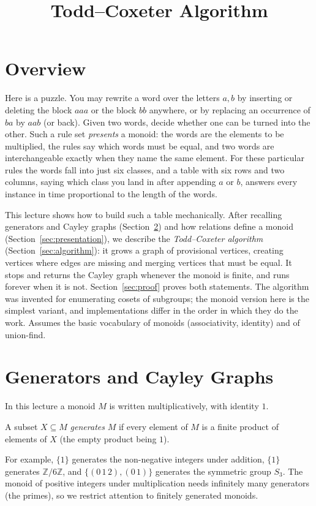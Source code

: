 \documentclass[11pt]{article}
\title{Todd--Coxeter Algorithm}
\author{}
\date{}
\begin{document}
\thispagestyle{fancy}


\section{Overview}
Here is a puzzle. You may rewrite a word over the letters $a,b$ by inserting or deleting the block $aaa$ or the block $bb$ anywhere, or by replacing an occurrence of $ba$ by $aab$ (or back).
Given two words, decide whether one can be turned into the other.
Such a rule set \emph{presents} a monoid: the words are the elements to be multiplied, the rules say which words must be equal, and two words are interchangeable exactly when they name the same element.
For these particular rules the words fall into just six classes, and a table with six rows and two columns, saying which class you land in after appending $a$ or $b$, answers every instance in time proportional to the length of the words.

This lecture shows how to build such a table mechanically. After recalling generators and Cayley graphs (Section~\ref{sec:cayley}) and how relations define a monoid (Section~\ref{sec:presentation}),
we describe the \emph{Todd--Coxeter algorithm} (Section~\ref{sec:algorithm}): it grows a graph of provisional vertices, creating vertices where edges are missing and merging vertices that must be equal.
It stops and returns the Cayley graph whenever the monoid is finite, and runs forever when it is not. Section~\ref{sec:proof} proves both statements.
The algorithm was invented for enumerating cosets of subgroups; the monoid version here is the simplest variant, and implementations differ in the order in which they do the work.
Assumes the basic vocabulary of monoids (associativity, identity) and of union-find.

\section{Generators and Cayley Graphs}\label{sec:cayley}
In this lecture a monoid $M$ is written multiplicatively, with identity $1$.

\begin{definitionbox}
A subset $X\subseteq M$ \emph{generates} $M$ if every element of $M$ is a finite product of elements of $X$ (the empty product being $1$).
\end{definitionbox}
For example, $\{1\}$ generates the non-negative integers under addition, $\{1\}$ generates $\mathbb{Z}/6\mathbb{Z}$, and $\{(0\,1\,2),(0\,1)\}$ generates the symmetric group $S_3$.
The monoid of positive integers under multiplication needs infinitely many generators (the primes), so we restrict attention to finitely generated monoids.
\end{document}
